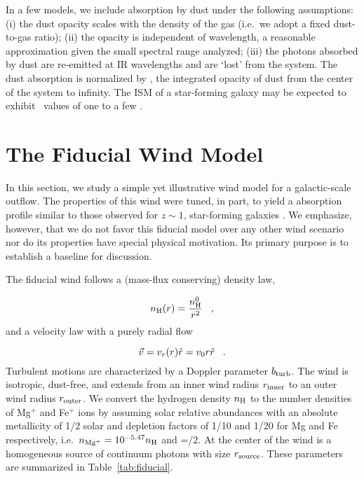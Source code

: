 \documentclass[12pt,preprint]{aastex}
\begin{document}
In a few models, we include absorption by dust under the following
assumptions:
(i) the dust opacity scales with the density of the gas (i.e.\ we
adopt a fixed dust-to-gas ratio);
(ii) the opacity is independent of wavelength, a reasonable
approximation given the small spectral range analyzed;
(iii) the photons absorbed by dust are re-emitted at IR wavelengths
and are `lost' from the system.  The dust absorption is normalized by \taud, 
the integrated opacity of dust from the center of the system to
infinity.  The ISM of a star-forming galaxy may be expected to exhibit
\taud\ values of one to a few \citep[e.g.][]{dust_again}.



\section{The Fiducial Wind Model}
\label{sec:fiducial}

In this section, we study a simple yet illustrative wind model for
a galactic-scale outflow.  The properties of this wind were tuned, in
part, to yield a  absorption profile 
similar to those observed for $z \sim 1$, star-forming galaxies
\citep{wcp+09,rubin+10b}.  We emphasize, however, that we do not
favor this fiducial model over any other wind scenario nor do its
properties have special physical motivation.
Its primary purpose is to establish a baseline
for discussion.

The fiducial wind follows a (mass-flux conserving) density law,

\begin{equation}
n_{\rm H} (r) = \frac{n^0_{\rm H}}{r^2} \;\;\; , 
\label{eqn:density}
\end{equation}
and a velocity law with a purely radial flow

\begin{equation}
\vec v = v_r (r) \hat r = v_0 r \hat r  \;\;\; .
\label{eqn:vel}
\end{equation}
Turbulent motions are
characterized by a Doppler parameter $b_{\rm turb}$.  
The wind is isotropic, dust-free, and extends from an inner wind
radius $r_{\rm inner}$ to an outer wind radius $r_{\rm outer}$.  
We convert the hydrogen density $n_{\rm H}$ to the number densities of
Mg$^+$ and Fe$^+$ ions by assuming solar relative abundances with an
absolute metallicity of 1/2 solar and depletion factors of 1/10 and
1/20 for Mg and Fe respectively, i.e.\  $n_{\rm Mg^+} = 10^{-5.47} n_{\rm H}$ 
and \nfe=\nmg/2. At the center of the wind is a homogeneous source of
continuum photons with size $r_{\rm source}$. These parameters are
summarized in Table~\ref{tab:fiducial}.   
\end{document}
